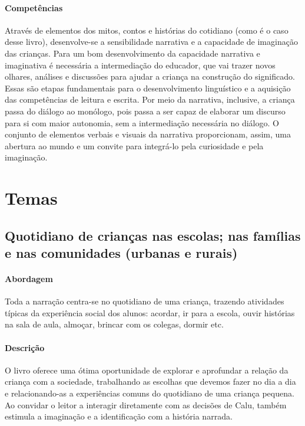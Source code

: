 \documentclass[11pt]{extarticle}
\begin{document}

\paragraph{Competências} 
Através de elementos dos mitos, contos e histórias do cotidiano (como é o caso desse livro), desenvolve-se a sensibilidade narrativa e a capacidade de imaginação das crianças. Para um bom desenvolvimento da capacidade narrativa e imaginativa é necessária a intermediação do educador, que vai trazer novos olhares, análises e discussões para ajudar a criança na construção do significado. Essas são etapas fundamentais para o desenvolvimento linguístico e a aquisição das competências de leitura e escrita. Por meio da narrativa, inclusive, a criança passa do diálogo ao monólogo, pois passa a ser capaz de elaborar um discurso para si com maior autonomia, sem a intermediação necessária no diálogo.
O conjunto de elementos verbais e visuais da narrativa proporcionam, assim,
uma abertura ao mundo e um convite para integrá-lo pela curiosidade e pela imaginação.


\section{Temas}

\subsection{Quotidiano de crianças nas escolas; nas famílias e nas comunidades (urbanas e rurais)}

\paragraph{Abordagem} Toda a narração centra-se no quotidiano de uma criança, trazendo atividades típicas da experiência social dos alunos: acordar, ir para a escola, ouvir histórias na sala de aula, almoçar, brincar com os colegas, dormir etc.

\paragraph{Descrição} O livro oferece uma ótima oportunidade de explorar 
e aprofundar a relação da criança com a sociedade, trabalhando as escolhas que devemos fazer no dia a dia e relacionando-as a experiências comuns do quotidiano de uma criança pequena. Ao convidar o leitor a interagir diretamente com as decisões de Calu, também estimula a imaginação e a identificação com a história narrada.
\end{document}
